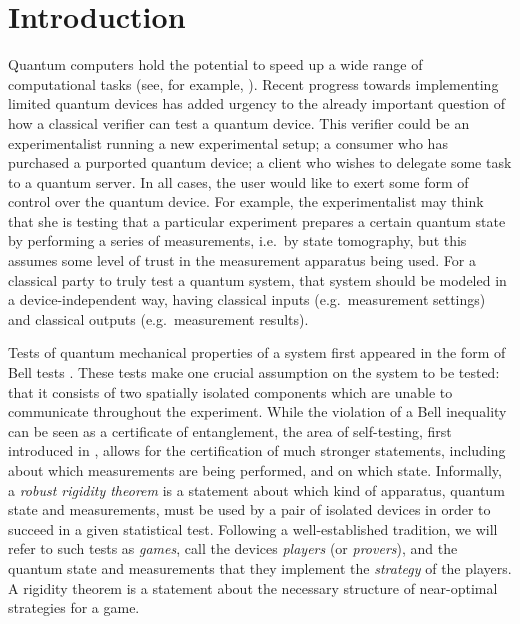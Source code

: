 \documentclass[11pt,letter]{article}
\theoremstyle{remark}
\theoremstyle{definition}
\begin{document}
\clearpage

\tableofcontents

\clearpage 

\section{Introduction}

Quantum computers hold the potential to speed up a wide range of computational tasks (see, for example, \cite{montanaro2016survey}). Recent progress towards implementing limited quantum devices has added urgency to the already important question of how a classical verifier can test a quantum device. This verifier could be an experimentalist running a new experimental setup; a consumer who has purchased a purported quantum device; a client who wishes to delegate some task to a quantum server. In all cases, the user would like to exert some form of control over the quantum device. For example, the experimentalist may think that she is testing that a particular experiment prepares a certain quantum state by performing a series of measurements, i.e.\ by state tomography, but this assumes some level of trust in the measurement apparatus being used.  For a classical party to truly test a quantum system, that system should be modeled in a device-independent way, having classical inputs (e.g.\ measurement settings) and classical outputs (e.g.\ measurement results). 

Tests of quantum mechanical properties of a system first appeared in the form of Bell tests \cite{Bell:64a,Clauser:69a}. These tests make one crucial assumption on the system to be tested: that it consists of two spatially isolated components which are unable to communicate throughout the experiment. While the violation of a Bell inequality can be seen as a certificate of entanglement, the area of self-testing, first introduced in \cite{mayers2004selftesting}, allows for the certification of much stronger statements, including  about which measurements are being performed, and on which state.  Informally, a \emph{robust rigidity theorem} is a statement about which kind of apparatus, quantum state and measurements, must be used by a pair of isolated devices in order to succeed in a given statistical test. Following a well-established tradition, we will refer to such tests as \emph{games}, call the devices \emph{players} (or \emph{provers}), and the quantum state and measurements that they implement the \emph{strategy} of the players. A rigidity theorem is a statement about the necessary structure of near-optimal strategies for a game.  
\end{document}
